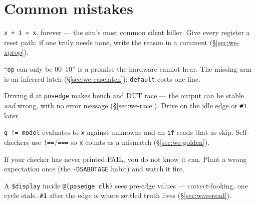 \section{Common mistakes}\label{sec:cm12}

\begin{tripwire}
\texttt{x + 1 = x}, forever --- the sim's most common silent killer.
Give every register a reset path; if one truly needs none, write the
reason in a comment (\S\ref{sec:we-xprop}).
\end{tripwire}
\begin{tripwire}
``\texttt{op} can only be 00--10'' is a promise the hardware cannot
hear. The missing arm is an inferred latch
(\S\ref{sec:we-caselatch}); \texttt{default} costs one line.
\end{tripwire}
\begin{tripwire}
Driving \texttt{d} at \texttt{posedge} makes bench and DUT race ---
the output can be stable \emph{and} wrong, with no error message
(\S\ref{sec:we-race}). Drive on the idle edge or \texttt{\#1} later.
\end{tripwire}
\begin{tripwire}[Comparing with \texttt{!=} when \texttt{x} may lurk]
\texttt{q != model} evaluates to \texttt{x} against unknowns and an
\texttt{if} reads that as skip. Self-checkers use
\texttt{!==}/\texttt{===} so \texttt{x} counts as a mismatch
(\S\ref{sec:we-golden}).
\end{tripwire}
\begin{tripwire}
If your checker has never printed FAIL, you do not know it can.
Plant a wrong expectation once (the \texttt{-DSABOTAGE} habit) and
watch it fire.
\end{tripwire}
\begin{tripwire}
A \texttt{\$display} inside \texttt{@(posedge clk)} sees pre-edge
values --- correct-looking, one cycle stale. \texttt{\#1} after the
edge is where settled truth lives (\S\ref{sec:waveread}).
\end{tripwire}

